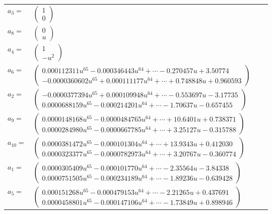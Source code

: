 \documentclass[1p]{elsarticle_modified}
\theoremstyle{definition}
\begin{document}
\begin{tabular}{m{7pt} m{180pt} m{7pt} m{180pt} }
\flushright $a_{3}=$&$\begin{pmatrix}1\\0\end{pmatrix}$ \\
\flushright $a_{8}=$&$\begin{pmatrix}0\\u\end{pmatrix}$ \\
\flushright $a_{4}=$&$\begin{pmatrix}1\\- u^2\end{pmatrix}$ \\
\flushright $a_{6}=$&$\begin{pmatrix}0.000112311 u^{65}-0.000346443 u^{64}+\cdots-0.270457 u+3.50774\\-0.0000360602 u^{65}+0.000111177 u^{64}+\cdots+0.748848 u+0.960593\end{pmatrix}$ \\
\flushright $a_{2}=$&$\begin{pmatrix}-0.0000377394 u^{65}+0.000109948 u^{64}+\cdots-0.553697 u-3.17735\\0.0000688159 u^{65}-0.000214201 u^{64}+\cdots-1.70637 u-0.657455\end{pmatrix}$ \\
\flushright $a_{9}=$&$\begin{pmatrix}0.0000148168 u^{65}-0.0000484765 u^{64}+\cdots+10.6401 u+0.738371\\0.0000284980 u^{65}-0.0000667785 u^{64}+\cdots+3.25127 u-0.315788\end{pmatrix}$ \\
\flushright $a_{10}=$&$\begin{pmatrix}0.0000381472 u^{65}-0.000101304 u^{64}+\cdots+13.9343 u+0.412030\\0.0000323377 u^{65}-0.0000782973 u^{64}+\cdots+3.20767 u-0.360774\end{pmatrix}$ \\
\flushright $a_{1}=$&$\begin{pmatrix}0.0000305409 u^{65}-0.000101770 u^{64}+\cdots-2.35564 u-3.84338\\0.0000751505 u^{65}-0.000234189 u^{64}+\cdots-1.89236 u-0.639428\end{pmatrix}$ \\
\flushright $a_{5}=$&$\begin{pmatrix}0.000151268 u^{65}-0.000479153 u^{64}+\cdots-2.21265 u+0.437691\\0.0000458801 u^{65}-0.000147106 u^{64}+\cdots-1.73849 u+0.898946\end{pmatrix}$ \\

\end{tabular}
\end{document}
